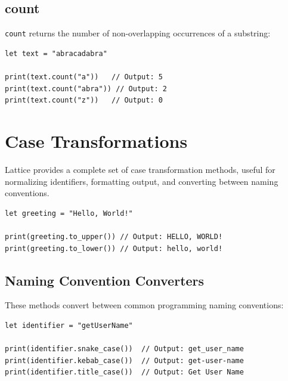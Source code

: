 \subsection{count}\label{sec:string-count}

\lstinline|count| returns the number of non-overlapping occurrences of a substring:

\begin{lstlisting}[language=Lattice, caption={Counting occurrences}]
let text = "abracadabra"

print(text.count("a"))   // Output: 5
print(text.count("abra")) // Output: 2
print(text.count("z"))   // Output: 0
\end{lstlisting}

\section{Case Transformations}\label{sec:case-transformations}

Lattice provides a complete set of case transformation methods, useful for normalizing identifiers, formatting output, and converting between naming conventions.

\begin{lstlisting}[language=Lattice, caption={Basic case conversion}]
let greeting = "Hello, World!"

print(greeting.to_upper()) // Output: HELLO, WORLD!
print(greeting.to_lower()) // Output: hello, world!
\end{lstlisting}

\subsection{Naming Convention Converters}\label{sec:naming-conventions}

These methods convert between common programming naming conventions:

\begin{lstlisting}[language=Lattice, caption={Naming convention transformations}]
let identifier = "getUserName"

print(identifier.snake_case())  // Output: get_user_name
print(identifier.kebab_case())  // Output: get-user-name
print(identifier.title_case())  // Output: Get User Name
\end{lstlisting}

